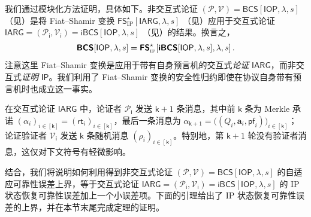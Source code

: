 \documentclass[american,singlepageview]{snargs-book-zh}
\renewcommand{\enspace}{\ensuremath{\thinspace}}
\renewcommand{\vec}[1]{\bm{#1}}
\newcommand{\ProtoProver}{P}
\newcommand{\ProtoVerifier}{V}
\newcommand{\ProtoRoundComplexity}{\mathsf{k}}
\newcommand{\RoundIndex}{i}
\newcommand{\IPSymbol}{\mathsf{IP}}
\newcommand{\IPSubscript}{\scriptscriptstyle\mathrm{IP}}
\newcommand{\IOPSymbol}{\mathsf{IOP}}
\newcommand{\IOPProverMessage}{\alpha}
\newcommand{\IOPEntry}{a}
\newcommand{\IOPEntries}{\vec{\IOPEntry}}
\newcommand{\IOPQuerySet}{Q}
\newcommand{\IOPVerifierRandomMessage}{\rho}
\newcommand{\IOPRoundComplexity}{\ProtoRoundComplexity}
\newcommand{\IOPVerifierRandomMessages}{(\IOPVerifierRandomMessage_{\RoundIndex})_{\RoundIndex \in [\IOPRoundComplexity]}}
\newcommand{\IOPTuple}[1]{(#1_{\RoundIndex})_{\RoundIndex \in [\IOPRoundComplexity]}}
\newcommand{\ARGFormat}[1]{\mathcal{#1}}
\newcommand{\ARGProver}{\ARGFormat{\ProtoProver}}
\newcommand{\ARGVerifier}{\ARGFormat{\ProtoVerifier}}
\newcommand{\ARGSystem}{(\ARGProver,\ARGVerifier)}
\newcommand{\IARGSymbol}{\mathsf{IARG}}
\newcommand{\SecurityParameter}{\lambda}
\newcommand{\PrivacyParameter}{s}
\newcommand{\MTCommitment}{\mathsf{rt}}
\newcommand{\MTProof}{\mathsf{pf}}
\newcommand{\FormatTransName}[1]{\bm{\mathsf{#1}}}
\newcommand{\FastFSonIPSymbol}{\FormatTransName{FS}_{\IPSubscript}^{\star}}
\newcommand{\IBCSSymbol}{\FormatTransName{iBCS}}
\newcommand{\BCSSymbol}{\FormatTransName{BCS}}
\newcommand{\FormatTransInputs}[3]{[#1,#2,#3]}
\newcommand{\FastFSonIPTransformation}[3]{\FastFSonIPSymbol\FormatTransInputs{#1}{#2}{#3}}
\newcommand{\IBCSTransformation}[3]{\IBCSSymbol\FormatTransInputs{#1}{#2}{#3}}
\newcommand{\BCSTransformation}[3]{\BCSSymbol\FormatTransInputs{#1}{#2}{#3}}
\newcommand{\IBCSProver}{\ARGProver_{\mathsf{i}}}
\newcommand{\IBCSVerifier}{\ARGVerifier_{\mathsf{i}}}
\begin{document}
我们通过模块化方法证明，具体如下。非交互式论证
\(\ARGSystem = \BCSTransformation{\IOPSymbol}{\SecurityParameter}{\PrivacyParameter}\)
（见）是将 Fiat--Shamir 变换
\(\FastFSonIPTransformation{\IARGSymbol}{\SecurityParameter}{\PrivacyParameter}\)
（见）应用于交互式论证
\(\IARGSymbol = (\IBCSProver,\IBCSVerifier)=\IBCSTransformation{\IOPSymbol}{\SecurityParameter}{\PrivacyParameter}\)
（见）的结果。换言之，
\begin{equation}
\label{equation:bcs-as-fs-applied-to-ibcs}
\BCSTransformation{\IOPSymbol}{\SecurityParameter}{\PrivacyParameter}
= \FastFSonIPTransformation{\IBCSTransformation{\IOPSymbol}{\SecurityParameter}{\PrivacyParameter}}{\SecurityParameter}{\PrivacyParameter}
\enspace.
\end{equation}
注意这里 Fiat--Shamir 变换是应用于带有自身预言机的交互式\emph{论证} \(\IARGSymbol\)，而非交互式\emph{证明} \(\IPSymbol\)。我们利用了 Fiat--Shamir 变换的安全性归约即使在协议自身带有预言机时也成立这一事实。

在交互式论证 \(\IARGSymbol\) 中，论证者 \(\IBCSProver\) 发送 \(\IOPRoundComplexity+1\) 条消息，其中前 \(\IOPRoundComplexity\) 条为 Merkle 承诺
\(\IOPTuple{\IOPProverMessage} = \IOPTuple{\MTCommitment}\)，最后一条消息为
\(\IOPProverMessage_{\IOPRoundComplexity+1} = \bigl((\IOPQuerySet_{\RoundIndex},\IOPEntries_{\RoundIndex},\MTProof_{\RoundIndex})\bigr)_{\RoundIndex\in[\IOPRoundComplexity]}\)；
论证验证者 \(\IBCSVerifier\) 发送 \(\IOPRoundComplexity\) 条随机消息
\(\IOPVerifierRandomMessages\)。特别地，第 \(\IOPRoundComplexity+1\) 轮没有验证者消息，这仅对下文符号有轻微影响。

结合，我们将说明如何利用得到非交互式论证
\(\ARGSystem = \BCSTransformation{\IOPSymbol}{\SecurityParameter}{\PrivacyParameter}\)
的自适应可靠性误差上界，等于交互式论证
\(\IARGSymbol = (\IBCSProver,\IBCSVerifier)=\IBCSTransformation{\IOPSymbol}{\SecurityParameter}{\PrivacyParameter}\)
的 IP 状态恢复可靠性误差加上一个小误差项。下面的引理给出了 IP 状态恢复可靠性误差的上界，并在本节末尾完成定理的证明。
\end{document}

